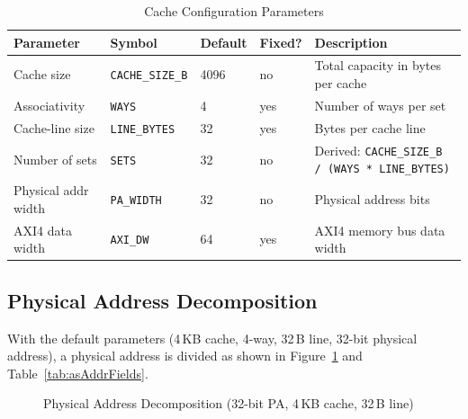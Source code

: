 \begin{table}[H]
\caption{Cache Configuration Parameters}
\label{tab:asCacheParams}
\centering
\begin{tabularx}{\textwidth}{|l |l |l |l |X|}
  \hline
  Parameter & Symbol & Default & Fixed? & Description \\
  \hline
  \hline
  Cache size          & \texttt{CACHE\_SIZE\_B} & 4096 & no  & Total capacity in bytes per cache \\
  \hline
  Associativity       & \texttt{WAYS}           & 4    & yes & Number of ways per set \\
  \hline
  Cache-line size     & \texttt{LINE\_BYTES}    & 32   & yes & Bytes per cache line \\
  \hline
  Number of sets      & \texttt{SETS}           & 32   & no  & Derived: \texttt{CACHE\_SIZE\_B / (WAYS * LINE\_BYTES)} \\
  \hline
  Physical addr width & \texttt{PA\_WIDTH}      & 32   & no  & Physical address bits \\
  \hline
  AXI4 data width     & \texttt{AXI\_DW}        & 64   & yes & AXI4 memory bus data width \\
  \hline
\end{tabularx}
\end{table}

\subsection{Physical Address Decomposition}

With the default parameters (4\,KB cache, 4-way, 32\,B line, 32-bit
physical address), a physical address is divided as shown in
Figure~\ref{fig:asAddrDecomp} and Table~\ref{tab:asAddrFields}.

\begin{figure}[H]
\centering
{}
\caption{Physical Address Decomposition (32-bit PA, 4\,KB cache, 32\,B line)}
\label{fig:asAddrDecomp}
\end{figure}

